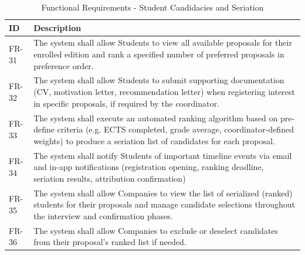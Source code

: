 {
    \begin{table}[H]
        \centering
        \caption{Functional Requirements - Student Candidacies and Seriation}
        \begin{tabular}{|l|p{12cm}|} %
            \hline
            \textbf{ID} & \textbf{Description} \\ \hline
            FR-31 & The system shall allow Students to view all available proposals for their enrolled edition and rank a specified number of preferred proposals in preference order. \\ \hline
            FR-32 & The system shall allow Students to submit supporting documentation (CV, motivation letter, recommendation letter) when registering interest in specific proposals, if required by the coordinator. \\ \hline
            FR-33 & The system shall execute an automated ranking algorithm based on pre-define criteria (e.g. ECTS completed, grade average, coordinator-defined weights) to produce a seriation list of candidates for each proposal. \\ \hline
            FR-34 & The system shall notify Students of important timeline events via email and in-app notifications (registration opening, ranking deadline, seriation results, attribution confirmation) \\ \hline
            FR-35 & The system shall allow Companies to view the list of serialized (ranked) students for their proposals and manage candidate selections throughout the interview and confirmation phases. \\ \hline
            FR-36 & The system shall allow Companies to exclude or deselect candidates from their proposal's ranked list if needed. \\ \hline
        \end{tabular}
    \end{table}    
}

